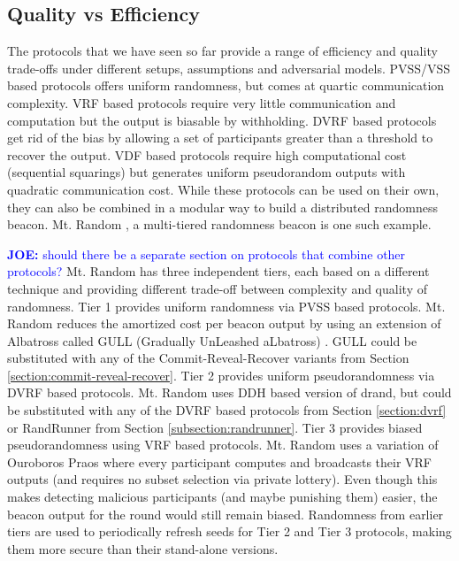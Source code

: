 \documentclass[letterpaper,twocolumn,10pt]{article}
\theoremstyle{definition}
\theoremstyle{remark}
\newcommand{\joenote}[1]{\textcolor{blue}{\textbf{JOE:} #1}}
\begin{document}
\subsection{Quality vs Efficiency}
The protocols that we have seen so far provide a range of efficiency and quality trade-offs under different setups, assumptions and adversarial models. PVSS/VSS based protocols offers uniform randomness, but comes at  quartic communication complexity. 
VRF based protocols require very little communication and computation but the output is biasable by withholding. DVRF based protocols get rid of the bias by allowing a set of participants greater than a threshold to recover the output. VDF based protocols require high computational cost (sequential squarings) but generates uniform pseudorandom outputs with quadratic communication cost. While these protocols can be used on their own, they can also be combined in a modular way to build a distributed randomness beacon. Mt. Random \cite{cascudomt}, a multi-tiered randomness beacon is one such example.

\joenote{should there be a separate section on protocols that combine other protocols?}
Mt. Random has three independent tiers, each based on a different technique and providing different trade-off between complexity and quality of randomness. Tier 1 provides uniform randomness via PVSS based protocols. Mt. Random reduces the amortized cost per beacon output by using an extension of Albatross called GULL (Gradually UnLeashed aLbatross) \cite{cascudomt}. GULL could be substituted with any of the Commit-Reveal-Recover variants from Section \ref{section:commit-reveal-recover}. Tier 2 provides uniform pseudorandomness via DVRF based protocols. Mt. Random uses DDH based version of drand, but could be substituted with any of the DVRF based protocols from Section \ref{section:dvrf} or RandRunner from Section \ref{subsection:randrunner}. Tier 3 provides biased pseudorandomness using VRF based protocols. Mt. Random uses a variation of Ouroboros Praos where every participant computes and broadcasts their VRF outputs (and requires no subset selection via private lottery). Even though this makes detecting malicious participants (and maybe punishing them) easier, the beacon output for the round would still remain biased. Randomness from earlier tiers are used to periodically refresh seeds for Tier 2 and Tier 3 protocols, making them more secure than their stand-alone versions.
\end{document}
